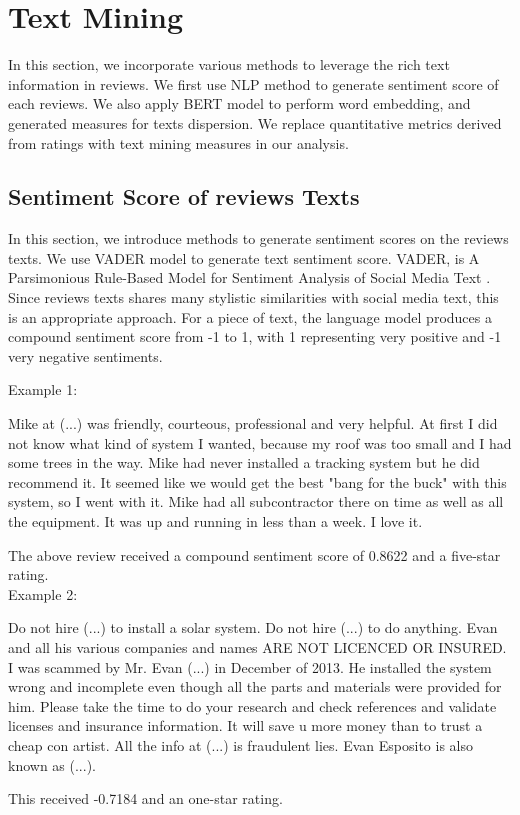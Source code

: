 \documentclass[msom,blindrev]{informs3}
\begin{document}
\section{Text Mining}
In this section, we incorporate various methods to leverage the rich text information in reviews.  We first use NLP method to generate sentiment score of each reviews. We also apply BERT model to perform word embedding, and generated measures for texts dispersion. We replace quantitative metrics derived from ratings with text mining measures in our analysis.

\subsection{Sentiment Score of reviews Texts}
In this section, we introduce methods to generate sentiment scores on the reviews texts. We use VADER model to generate text sentiment score. VADER, is A Parsimonious Rule-Based Model for Sentiment Analysis of Social Media Text \citep{hutto2014vader}. Since reviews texts shares many stylistic similarities with social media text, this is an appropriate approach. For a piece of text, the language model produces a compound sentiment score from -1 to 1, with 1 representing very positive and -1  very negative sentiments.




 Example 1:
 \begin{displayquote}
Mike at (...) was friendly, courteous, professional and very helpful.  At first I did not know what kind of system I wanted, because my roof was too small and I had some trees in the way.  Mike had never installed a tracking system but he did recommend it.  It seemed like we would get the best "bang for the buck" with this system, so I went with it.  Mike had all subcontractor there on time as well as all the equipment.  It was up and running in less than a week.  I love it.
\end{displayquote}
The above review received a compound sentiment score of 0.8622 and a five-star rating. \\
 Example 2:
\begin{displayquote}
Do not hire (...)  to install a solar system. Do not hire (...) to do anything. Evan   and all his various companies and names  ARE NOT LICENCED OR INSURED. I was scammed by Mr. Evan (...) in December of 2013. He installed the system wrong and incomplete even though all the parts and materials were provided for him. Please take the time to do your research and check references and validate licenses and insurance information. It will save u more money than to trust a cheap con artist. All the info at (...)  is fraudulent lies. Evan Esposito is also known as (...).
\end{displayquote}
This received -0.7184 and an one-star rating.
\end{document}
